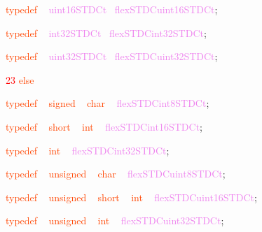 \documentclass[8, usernames, dvipsnames]{beamer}
\begin{document}
\begin{frame}
\textcolor{OrangeRed}{typedef}
\textcolor{White}{\ }
\textcolor{Violet}{uint16STDCt}\textcolor{White}{\ }
\textcolor{Violet}{flexSTDCuint16STDCt}\textcolor{Sepia}{;}

 \textcolor{OrangeRed}{typedef}
\textcolor{White}{\ }
\textcolor{Violet}{int32STDCt}\textcolor{White}{\ }
\textcolor{Violet}{flexSTDCint32STDCt}\textcolor{Sepia}{;}

 \textcolor{OrangeRed}{typedef}
\textcolor{White}{\ }
\textcolor{Violet}{uint32STDCt}\textcolor{White}{\ }
\textcolor{Violet}{flexSTDCuint32STDCt}\textcolor{Sepia}{;}

  \textcolor{Red}{23}
\textcolor{OrangeRed}{else}

 \textcolor{OrangeRed}{typedef}
\textcolor{White}{\ }
\textcolor{OrangeRed}{signed}
\textcolor{White}{\ }
\textcolor{OrangeRed}{char}
\textcolor{White}{\ }
\textcolor{Violet}{flexSTDCint8STDCt}\textcolor{Sepia}{;}

 \textcolor{OrangeRed}{typedef}
\textcolor{White}{\ }
\textcolor{OrangeRed}{short}
\textcolor{White}{\ }
\textcolor{OrangeRed}{int}
\textcolor{White}{\ }
\textcolor{Violet}{flexSTDCint16STDCt}\textcolor{Sepia}{;}

 \textcolor{OrangeRed}{typedef}
\textcolor{White}{\ }
\textcolor{OrangeRed}{int}
\textcolor{White}{\ }
\textcolor{Violet}{flexSTDCint32STDCt}\textcolor{Sepia}{;}

 \textcolor{OrangeRed}{typedef}
\textcolor{White}{\ }
\textcolor{OrangeRed}{unsigned}
\textcolor{White}{\ }
\textcolor{OrangeRed}{char}
\textcolor{White}{\ }
\textcolor{Violet}{flexSTDCuint8STDCt}\textcolor{Sepia}{;}
\textcolor{White}{\ }

 \textcolor{OrangeRed}{typedef}
\textcolor{White}{\ }
\textcolor{OrangeRed}{unsigned}
\textcolor{White}{\ }
\textcolor{OrangeRed}{short}
\textcolor{White}{\ }
\textcolor{OrangeRed}{int}
\textcolor{White}{\ }
\textcolor{Violet}{flexSTDCuint16STDCt}\textcolor{Sepia}{;}

 \textcolor{OrangeRed}{typedef}
\textcolor{White}{\ }
\textcolor{OrangeRed}{unsigned}
\textcolor{White}{\ }
\textcolor{OrangeRed}{int}
\textcolor{White}{\ }
\textcolor{Violet}{flexSTDCuint32STDCt}\textcolor{Sepia}{;}

 \end{frame}
\end{document}
